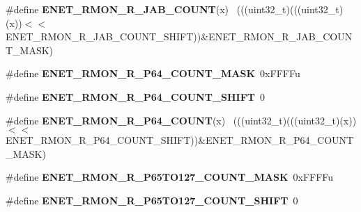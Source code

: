 \begin{DoxyCompactItemize}
\item 
\hypertarget{group___e_n_e_t___register___masks_gae6e056f54caaf4cf9dfa1a4d7f4b057f}{}\#define {\bfseries E\+N\+E\+T\+\_\+\+R\+M\+O\+N\+\_\+\+R\+\_\+\+J\+A\+B\+\_\+\+C\+O\+U\+N\+T}(x)                              ~(((uint32\+\_\+t)(((uint32\+\_\+t)(x))$<$$<$E\+N\+E\+T\+\_\+\+R\+M\+O\+N\+\_\+\+R\+\_\+\+J\+A\+B\+\_\+\+C\+O\+U\+N\+T\+\_\+\+S\+H\+I\+F\+T))\&E\+N\+E\+T\+\_\+\+R\+M\+O\+N\+\_\+\+R\+\_\+\+J\+A\+B\+\_\+\+C\+O\+U\+N\+T\+\_\+\+M\+A\+S\+K)\label{group___e_n_e_t___register___masks_gae6e056f54caaf4cf9dfa1a4d7f4b057f}

\item 
\hypertarget{group___e_n_e_t___register___masks_ga68d9c25cccce4ef0703577bf06b5bb58}{}\#define {\bfseries E\+N\+E\+T\+\_\+\+R\+M\+O\+N\+\_\+\+R\+\_\+\+P64\+\_\+\+C\+O\+U\+N\+T\+\_\+\+M\+A\+S\+K}~0x\+F\+F\+F\+Fu\label{group___e_n_e_t___register___masks_ga68d9c25cccce4ef0703577bf06b5bb58}

\item 
\hypertarget{group___e_n_e_t___register___masks_gaf011d25e6625c11c485b9081f2b9a611}{}\#define {\bfseries E\+N\+E\+T\+\_\+\+R\+M\+O\+N\+\_\+\+R\+\_\+\+P64\+\_\+\+C\+O\+U\+N\+T\+\_\+\+S\+H\+I\+F\+T}~0\label{group___e_n_e_t___register___masks_gaf011d25e6625c11c485b9081f2b9a611}

\item 
\hypertarget{group___e_n_e_t___register___masks_ga476f547199e0ed052d746b05c8401716}{}\#define {\bfseries E\+N\+E\+T\+\_\+\+R\+M\+O\+N\+\_\+\+R\+\_\+\+P64\+\_\+\+C\+O\+U\+N\+T}(x)                              ~(((uint32\+\_\+t)(((uint32\+\_\+t)(x))$<$$<$E\+N\+E\+T\+\_\+\+R\+M\+O\+N\+\_\+\+R\+\_\+\+P64\+\_\+\+C\+O\+U\+N\+T\+\_\+\+S\+H\+I\+F\+T))\&E\+N\+E\+T\+\_\+\+R\+M\+O\+N\+\_\+\+R\+\_\+\+P64\+\_\+\+C\+O\+U\+N\+T\+\_\+\+M\+A\+S\+K)\label{group___e_n_e_t___register___masks_ga476f547199e0ed052d746b05c8401716}

\item 
\hypertarget{group___e_n_e_t___register___masks_ga2a632b9df359a8efad215ab90dc33157}{}\#define {\bfseries E\+N\+E\+T\+\_\+\+R\+M\+O\+N\+\_\+\+R\+\_\+\+P65\+T\+O127\+\_\+\+C\+O\+U\+N\+T\+\_\+\+M\+A\+S\+K}~0x\+F\+F\+F\+Fu\label{group___e_n_e_t___register___masks_ga2a632b9df359a8efad215ab90dc33157}

\item 
\hypertarget{group___e_n_e_t___register___masks_gac93f4bae8a600e98833a132aa02065a0}{}\#define {\bfseries E\+N\+E\+T\+\_\+\+R\+M\+O\+N\+\_\+\+R\+\_\+\+P65\+T\+O127\+\_\+\+C\+O\+U\+N\+T\+\_\+\+S\+H\+I\+F\+T}~0\label{group___e_n_e_t___register___masks_gac93f4bae8a600e98833a132aa02065a0}


\end{DoxyCompactItemize}
